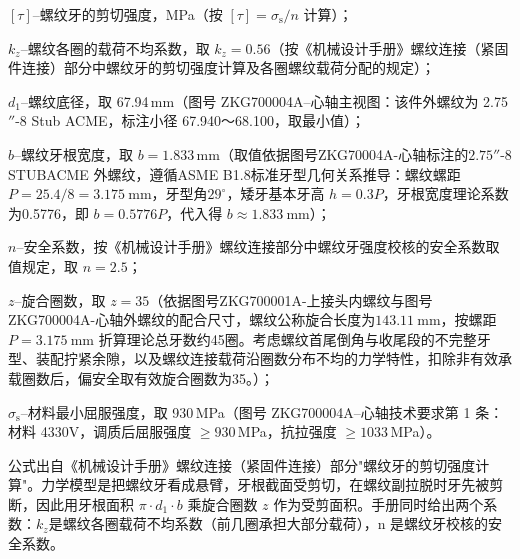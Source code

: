 $[\tau]$--螺纹牙的剪切强度，MPa（按 $[\tau]=\sigma_{\mathrm{s}}/n$ 计算）；

$k_z$--螺纹各圈的载荷不均系数，取 $k_z = 0.56$（按《机械设计手册》螺纹连接（紧固件连接）部分中螺纹牙的剪切强度计算及各圈螺纹载荷分配的规定\cite{ref26}）；

$d_1$--螺纹底径，取 67.94\,mm（图号 ZKG700004A--心轴主视图：该件外螺纹为 2.75$''$-8 Stub ACME，标注小径 67.940～68.100，取最小值）；

$b$--螺纹牙根宽度，取 $b=1.833\,\text{mm}$（取值依据图号ZKG70004A-心轴标注的$2.75''$-8 STUBACME 外螺纹，遵循ASME B1.8标准牙型几何关系推导：螺纹螺距 $P=25.4/8=3.175\ \mathrm{mm}$，牙型角$29^\circ$，矮牙基本牙高 $h=0.3P$，牙根宽度理论系数为0.5776，即 $b=0.5776P$，代入得 $b\approx1.833\ \mathrm{mm}$）；

$n$--安全系数，按《机械设计手册》螺纹连接部分中螺纹牙强度校核的安全系数取值规定\cite{ref26}，取 $n = 2.5$；

$z$--旋合圈数，取 $z=35$（依据图号ZKG700001A-上接头内螺纹与图号ZKG700004A-心轴外螺纹的配合尺寸，螺纹公称旋合长度为$143.11\ \mathrm{mm}$，按螺距 $P=3.175\ \mathrm{mm}$ 折算理论总牙数约45圈。考虑螺纹首尾倒角与收尾段的不完整牙型、装配拧紧余隙，以及螺纹连接载荷沿圈数分布不均的力学特性，扣除非有效承载圈数后，偏安全取有效旋合圈数为35。）；

$\sigma_{\mathrm{s}}$--材料最小屈服强度，取 930\,MPa（图号 ZKG700004A--心轴技术要求第 1 条：材料 4330V，调质后屈服强度 $\ge 930$\,MPa，抗拉强度 $\ge 1033$\,MPa）。

公式出自《机械设计手册》螺纹连接（紧固件连接）部分"螺纹牙的剪切强度计算"。力学模型是把螺纹牙看成悬臂，牙根截面受剪切，在螺纹副拉脱时牙先被剪断，因此用牙根面积 \(\pi \cdot d_1 \cdot b\) 乘旋合圈数 \(z\) 作为受剪面积。手册同时给出两个系数：$k_z$是螺纹各圈载荷不均系数（前几圈承担大部分载荷），n 是螺纹牙校核的安全系数。

